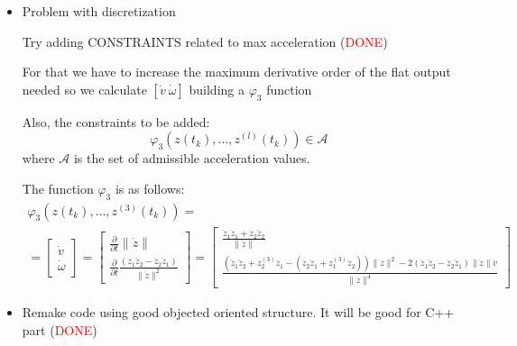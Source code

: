 \begin{itemize}
\item Problem with discretization

Try adding CONSTRAINTS related to max acceleration (\textcolor{red}{DONE})

For that we have to increase the maximum derivative order of the flat output needed so we calculate $[\dot{v}\ \dot{\omega}]$ building a $\varphi_3$ function

Also, the constraints to be added:
\[
	\varphi_3(z(t_k),\dotsc,z^{(l)}(t_k)) \in \mathcal{A}
\]
where $\mathcal{A}$ is the set of admissible acceleration values.

The function $\varphi_3$ is as follows:
\[
\begin{array}{l}
\varphi_3(z(t_k),\dotsc,z^{(3)}(t_k))=\\
=\left[\begin{array}{c}
\dot{v}\\
\dot{\omega}
\end{array}\right]
= \left[\begin{array}{c}
\frac{\partial}{\partial t}\|\dot{z}\|\\
\frac{\partial}{\partial t}\frac{(\dot{z}_1\ddot{z}_2-\dot{z}_2\ddot{z}_1)}{\|\dot{z}\|^2}
\end{array}\right] = \left[\begin{array}{c}
\frac{\dot{z}_1\ddot{z}_1 + \dot{z}_2\ddot{z}_2}{\|\dot{z}\|}\\
\frac{(\ddot{z}_1\ddot{z}_2+ z^{(3)}_2\dot{z}_1 - (\ddot{z}_2\ddot{z}_1+z^{(3)}_1\dot{z}_2))\|\dot{z}\|^2-2(\dot{z}_1\ddot{z}_2-\dot{z}_2\ddot{z}_1)\|\dot{z}\|\dot{v}}{\|\dot{z}\|^4}
\end{array}\right]
\end{array}
\]


% 
% 

\item Remake code using good objected oriented structure. It will be good for C++ part (\textcolor{red}{DONE})

\end{itemize}

